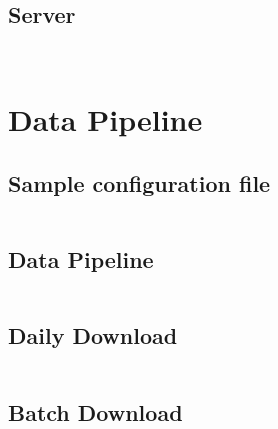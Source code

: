 \subsection{Server} \label{appendix:pilot:server}
\vspace{1em}
\inputminted{javascript}{tools/pilot-study/server-package.json}
\inputminted{javascript}{tools/pilot-study/server-server.js}

\section{Data Pipeline}\label{appendix:data:pipeline}

\subsection{Sample configuration file } 
\vspace{1em}
\inputminted{javascript}{tools/pipeline/config_sample.json}

\subsection{Data Pipeline}
\vspace{1em}
\inputminted{bash}{tools/pipeline/pipeline}

\subsection{Daily Download}
\vspace{1em}
\inputminted{bash}{tools/pipeline/daily}

\subsection{Batch Download}
\vspace{1em}
\inputminted{bash}{tools/pipeline/batch}

